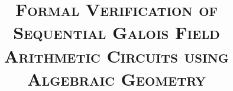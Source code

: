 \documentclass[twocolumn]{article}
\begin{document}
\date{}

\title{\Large\textsc{Formal Verification of Sequential Galois Field
      Arithmetic Circuits using Algebraic Geometry}}	%


\maketitle
\thispagestyle{empty}

\newcommand{\Fq}{{\mathbb{F}}_{q}}
\newcommand{\Fkk}{{\mathbb{F}}_{2^k}}
\newcommand{\Fkkx}[1][x]{\ensuremath{\mathbb{F}}_{2^k}[#1]\xspace}
\newcommand{\Grobner}{Gr\"{o}bner\xspace}
\newcommand{\B}{{\mathbb{B}}}
\newcommand{\Z}{{\mathbb{Z}}}
\newcommand{\F}{{\mathcal{F}}}
\newcommand{\G}{{\mathcal{G}}}
\end{document}
